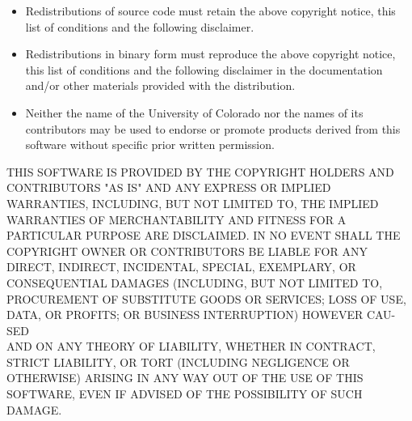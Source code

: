 \documentclass[a4paper,10pt]{scrartcl}
\begin{document}
\begin{itemize}
\item
Redistributions of source code must retain the above copyright
notice, this list of conditions and the following disclaimer.
\item
Redistributions in binary form must reproduce the above copyright
notice, this list of conditions and the following disclaimer in the
documentation and/or other materials provided with the distribution.
\item
Neither the name of the University of Colorado nor the names of its
contributors may be used to endorse or promote products derived from
this software without specific prior written permission.
\end{itemize}
THIS SOFTWARE IS PROVIDED BY THE COPYRIGHT HOLDERS AND CONTRIBUTORS
"AS IS" AND ANY EXPRESS OR IMPLIED WARRAN\-TIES, INCLUDING, BUT NOT
LIMITED TO, THE IMPLIED WARRANTIES OF MERCHANTABILITY AND FITNESS
FOR A PARTICULAR PURPOSE ARE DISCLAIMED. IN NO EVENT SHALL THE
COPYRIGHT OWNER OR CONTRIBUTORS BE LIABLE FOR ANY DIRECT, INDIRECT,
INCIDENTAL, SPECIAL, EXEMPLARY, OR CONSEQUENTIAL DAMAGES (INCLUDING,
BUT NOT LIMITED TO, PROCUREMENT OF SUBSTITUTE GOODS OR SERVICES;
LOSS OF USE, DATA, OR PROFITS; OR BUSINESS INTERRUPTION) HOWEVER
CAU-SED
\\ AND ON ANY THEORY OF LIABILITY, WHETHER IN CONTRACT, STRICT
LIABILITY, OR TORT (INCLUDING NEGLIGENCE OR OTHERWISE) ARISING IN
ANY WAY OUT OF THE USE OF THIS SOFTWARE, EVEN IF ADVISED OF THE
POSSIBILITY OF SUCH DAMAGE.





\appendix

\end{document}

